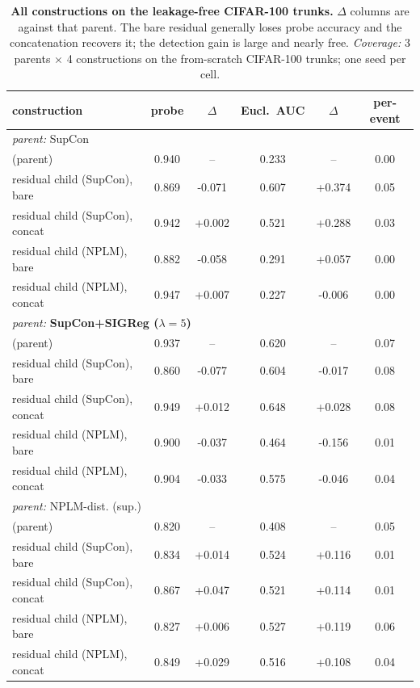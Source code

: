 \begin{table}[t]
\centering
\small
\begin{tabular}{lccccc}
\toprule
construction & probe & $\Delta$ & Eucl.\ AUC & $\Delta$ & per-event \\
\midrule
\multicolumn{6}{l}{\emph{parent: }SupCon} \\
\quad (parent) & 0.940 & -- & 0.233 & -- & 0.00 \\
\quad residual child (SupCon), bare & 0.869 & -0.071 & 0.607 & +0.374 & 0.05 \\
\quad residual child (SupCon), concat & 0.942 & +0.002 & 0.521 & +0.288 & 0.03 \\
\quad residual child (NPLM), bare & 0.882 & -0.058 & 0.291 & +0.057 & 0.00 \\
\quad residual child (NPLM), concat & 0.947 & +0.007 & 0.227 & -0.006 & 0.00 \\
\multicolumn{6}{l}{\emph{parent: }\textbf{SupCon+SIGReg ($\lambda{=}5$)}} \\
\quad (parent) & 0.937 & -- & 0.620 & -- & 0.07 \\
\quad residual child (SupCon), bare & 0.860 & -0.077 & 0.604 & -0.017 & 0.08 \\
\quad residual child (SupCon), concat & 0.949 & +0.012 & 0.648 & +0.028 & 0.08 \\
\quad residual child (NPLM), bare & 0.900 & -0.037 & 0.464 & -0.156 & 0.01 \\
\quad residual child (NPLM), concat & 0.904 & -0.033 & 0.575 & -0.046 & 0.04 \\
\multicolumn{6}{l}{\emph{parent: }NPLM-dist. (sup.)} \\
\quad (parent) & 0.820 & -- & 0.408 & -- & 0.05 \\
\quad residual child (SupCon), bare & 0.834 & +0.014 & 0.524 & +0.116 & 0.01 \\
\quad residual child (SupCon), concat & 0.867 & +0.047 & 0.521 & +0.114 & 0.01 \\
\quad residual child (NPLM), bare & 0.827 & +0.006 & 0.527 & +0.119 & 0.06 \\
\quad residual child (NPLM), concat & 0.849 & +0.029 & 0.516 & +0.108 & 0.04 \\
\bottomrule
\end{tabular}
\caption{\textbf{All constructions on the leakage-free CIFAR-100 trunks.} $\Delta$ columns are against that parent. The bare residual generally loses probe accuracy and the concatenation recovers it; the detection gain is large and nearly free. \emph{Coverage:} 3 parents $\times$ 4 constructions on the from-scratch CIFAR-100 trunks; one seed per cell.}
\label{tab:residuals}
\end{table}
